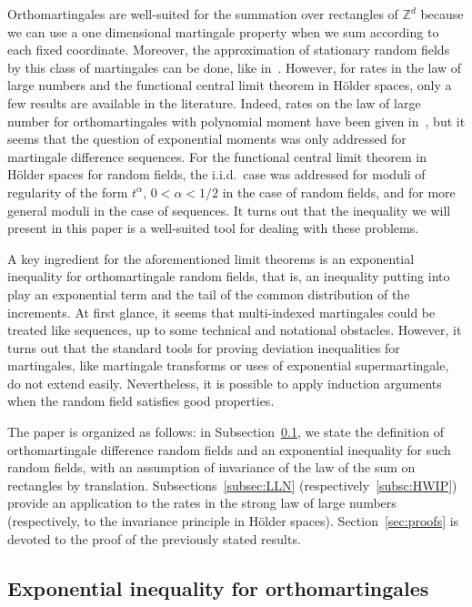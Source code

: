 \documentclass[10pt]{amsart}
\theoremstyle{definition}\newtheorem{defi}[theo]{Definition}\newtheorem{rema}[theo]{Remark}\newtheorem{exam}[theo]{Example}\newtheorem{exem}[theo]{Example}\newtheorem{nota}[theo]{Notation}
\newcommand\Z{\mathbb{Z}}
\begin{document}
Orthomartingales are well-suited for the summation over rectangles of $\Z^d$ because we can use a one dimensional martingale property when we sum according to each fixed coordinate. Moreover, the approximation of stationary random fields by this class of martingales can be done, like in~\cite{MR3504508,MR3869881,MR3798239,MR4166203}. However, for rates in the law of large numbers and the functional central limit theorem in H\"older spaces, only a few results are available in the literature. Indeed, rates on the law of large number for orthomartingales with polynomial moment have been given in~\cite{MR4046858,MR2794415,MR3451971}, but it seems that the question of exponential moments was only addressed for martingale difference sequences. For the functional central limit theorem in H\"older spaces for random fields, the i.i.d.\ case was addressed for moduli of regularity of the form $t^\alpha$, $0<\alpha<1/2$ in the case of random fields, and for more general moduli in the case of sequences. It turns out that the inequality we will present in this paper is a well-suited tool for dealing with these problems.

A key ingredient for the aforementioned limit theorems is an exponential inequality for orthomartingale random fields, that is, an inequality putting into play an exponential term and the tail of the common distribution of the increments. At first glance, it seems that multi-indexed martingales could be treated like sequences, up to some technical and notational obstacles. However, it turns out that the standard tools for proving deviation inequalities for martingales, like martingale transforms or uses of exponential supermartingale, do not extend easily. Nevertheless, it is possible to apply induction arguments when the random field satisfies good properties.

The paper is organized as follows: in Subsection~\ref{subsec:expo_ineg}, we state the definition of orthomartingale difference random fields and an exponential inequality for such random fields, with an assumption of invariance of the law of the sum on rectangles by translation. Subsections~\ref{subsec:LLN} (respectively~\ref{subsc:HWIP}) provide an application to the rates in the strong law of large numbers (respectively, to the invariance principle in H\"older spaces). Section~\ref{sec:proofs} is devoted to the proof of the previously stated results.

\subsection{Exponential inequality for orthomartingales}\label{subsec:expo_ineg}
\end{document}
